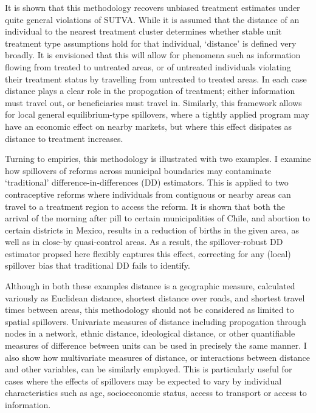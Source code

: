 It is shown that this methodology recovers unbiased treatment estimates under 
quite general violations of SUTVA.  While it is assumed that the distance of 
an individual to the nearest treatment cluster determines whether stable unit 
treatment type assumptions hold for that individual, `distance' is defined 
very broadly.  It is envisioned that this will allow for phenomena such as 
information flowing from treated to untreated areas, or of untreated 
individuals violating their treatment status by travelling from untreated to
treated areas.  In each case distance plays a clear role in the propogation 
of treatment; either information must travel out, or beneficiaries must travel 
in. Similarly, this framework allows for local general equilibrium-type 
spillovers, where a tightly applied program may have an economic effect on 
nearby markets, but where this effect disipates as distance to treatment 
increases.

Turning to empirics, this methodology is illustrated with two examples.
I examine how spillovers of reforms across municipal boundaries may 
contaminate `traditional' difference-in-differences (DD) estimators.  This is 
applied to two contraceptive reforms where individuals from contiguous or nearby 
areas can travel to a treatment region to access the reform.  It is shown that 
both the arrival of the morning after pill to certain municipalities of Chile, 
and abortion to certain districts in Mexico, results in a reduction of births in 
the given area, as well as in close-by quasi-control areas.  As a result, the 
spillover-robust DD estimator propsed here flexibly captures this effect, 
correcting for any (local) spillover bias that traditional DD fails to 
identify.

Although in both these examples distance is a geographic measure, calculated
variously as Euclidean distance, shortest distance over roads, and shortest 
travel times between areas, this methodology should not be considered as limited 
to spatial spillovers.  Univariate measures of distance including propogation 
through nodes in a network, ethnic distance, ideological distance, or other 
quantifiable measures of difference between units can be used in precisely the 
same manner.  I also show how multivariate measures of distance, or interactions 
between distance and other variables, can be similarly employed.  This is 
particularly useful for cases where the effects of spillovers may be expected to 
vary by individual characteristics such as age, socioeconomic status, access to 
transport or access to information.


